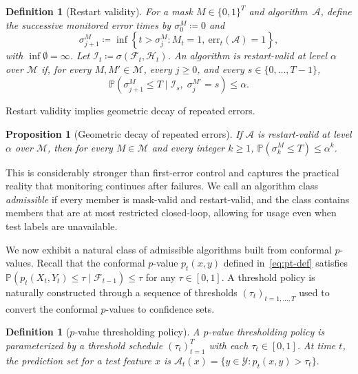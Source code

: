 \documentclass{uai2026} %
\newtheorem{proposition}[theorem]{Proposition}
\newtheorem{definition}[theorem]{Definition}
\newcommand{\1}{\mathbf{1}}
\newcommand{\prob}{\mathbb{P}}
\newcommand{\ycal}{\mathcal{Y}}
\newcommand{\err}{\mathrm{err}}
\newcommand{\F}{\mathcal{F}}
\newcommand{\mcal}{\mathcal{M}}
\newcommand{\acal}{\mathcal{A}}
\begin{document}
\begin{definition}[Restart validity]
  \label{def:restart-valid}
  For a mask $M\in\{0,1\}^{T}$ and algorithm~$\acal$, define the successive monitored error times by $\sigma_0^{M}\coloneqq 0$ and
  \begin{equation*}
    \sigma_{j+1}^{M}
    \coloneqq
    \inf\left\{t > \sigma_{j}^{M} \colon M_t=1,\ \err_t(\acal)=1 \right\},
  \end{equation*}
  with $\inf\emptyset=\infty$.
  Let $\mathcal{I}_t\coloneqq \sigma(\F_t,\mathcal{H}_t)$.
  An algorithm is \emph{restart-valid at level $\alpha$} over $\mcal$ if, for every $M, M'\in\mcal$, every $j\ge 0$, and every $s\in\{0,\dots,T-1\}$,
  \begin{equation*}
    \prob(\sigma_{j+1}^{M}\le T \mid \mathcal{I}_s,\; \sigma_j^{M'}=s)
    \le \alpha.
  \end{equation*}
\end{definition}

Restart validity implies geometric decay of repeated errors.

\begin{proposition}[Geometric decay of repeated errors]
  \label{prop:geom-decay}
  If $\acal$ is restart-valid at level $\alpha$ over $\mcal$, then for every $M\in\mcal$ and every integer $k\ge 1$, $\prob(\sigma_k^{M}\le T)\le \alpha^k$.
\end{proposition}

This is considerably stronger than first-error control and captures the practical reality that monitoring continues after failures.
We call an algorithm class \emph{admissible} if every member is mask-valid and restart-valid, and the class contains members that are at most restricted closed-loop, allowing for usage even when test labels are unavailable.

We now exhibit a natural class of admissible algorithms built from conformal $p$-values.
Recall that the conformal $p$-value $p_t(x,y)$ defined in~\eqref{eq:pt-def} satisfies $\prob(p_t(X_t, Y_t) \le \tau \mid \F_{t-1}) \le \tau$ for any $\tau \in [0,1]$.
A threshold policy is naturally constructed through a sequence of thresholds $(\tau_t)_{t=1,\ldots, T}$ used to convert the conformal $p$-values to confidence sets.

\begin{definition}[$p$-value thresholding policy]
  \label{def:pval-threshold-policy}
  A \emph{$p$-value thresholding policy} is parameterized by a \emph{threshold schedule} $(\tau_t)_{t=1}^{T}$ with each $\tau_t \in [0,1]$. At time $t$, the prediction set for a test feature $x$ is $\acal_t(x) = \{y \in \ycal : p_t(x, y) > \tau_t\}.$
\end{definition}
\end{document}
